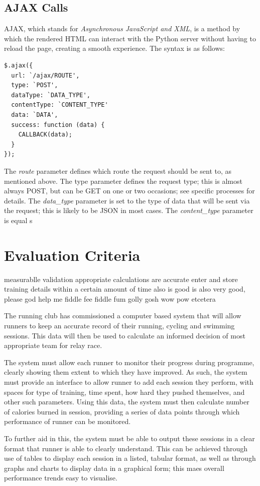 \documentclass{article}[12pt,a4paper]
\begin{document}
\subsection{AJAX Calls}
AJAX, which stands for \textit{Asynchronous JavaScript and XML}, is a method by which the rendered HTML can interact with the Python server without having to reload the page, creating a smooth experience. The syntax is as follows:

\begin{verbatim}
$.ajax({
  url: `/ajax/ROUTE',
  type: `POST',
  dataType: `DATA_TYPE',
  contentType: `CONTENT_TYPE'
  data: `DATA',
  success: function (data) {
    CALLBACK(data);
  }
});
\end{verbatim}
The \textit{route} parameter defines which route the request should be sent to, as mentioned above. The 
type parameter defines the request type; this is almost always POST, but can be GET on one or two occasions; see specific processes for details. The \textit{data\_type} parameter is set to the type of data that will be sent via the request; this is likely to be JSON in most cases. The \textit{content\_type} parameter is equal s
 
\section{Evaluation Criteria}
measurablle
validation appropriate
calculations are accurate
enter and store training details within a certain amount of time
also is good is also very good, please god help me fiddle fee fiddle fum golly gosh wow pow etcetera

The running club has commissioned  a computer based system that will allow runners to keep an accurate record of their running, cycling and swimming sessions. This data will then be used to calculate an informed decision of most appropriate team for relay race.

The system must allow each runner to monitor their progress during programme, clearly showing them extent to which they have improved. As such, the system must provide an interface to allow runner to add each session they perform, with spaces for type of training, time spent, how hard they pushed themselves, and other such parameters. Using this data, the system must then calculate number of calories burned in session, providing a series of data points through which performance of runner can be monitored.

To further aid in this, the system must be able to output these sessions in a clear format that runner is able to clearly understand. This can be achieved through use of tables to display each session in a listed, tabular format, as well as through graphs and charts to display data in a graphical form; this maes overall performance trends easy to visualise.
\end{document}
